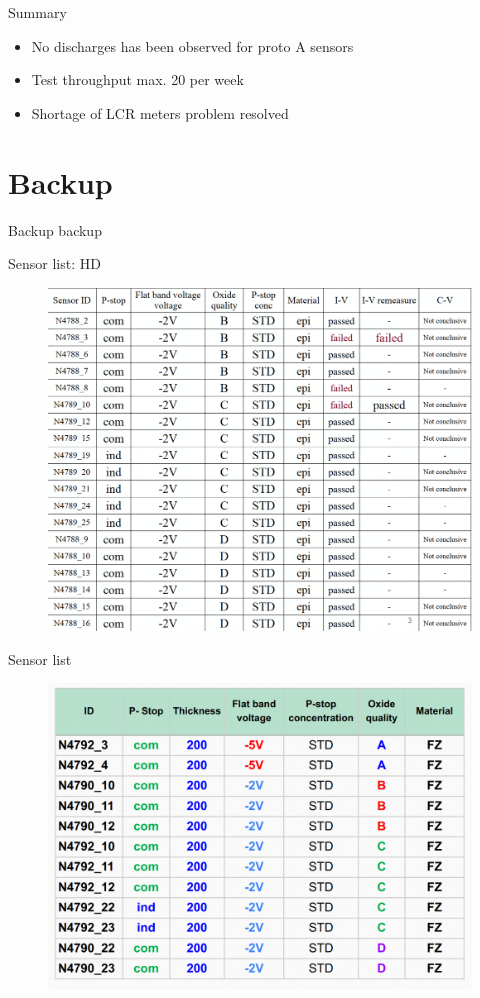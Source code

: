 \documentclass{beamer}
\begin{document}
\begin{frame}{Summary}
  \begin{itemize}
    \item No discharges has been observed for proto A sensors
    \item Test throughput max. 20 per week
    \item Shortage of LCR meters problem resolved
  \end{itemize}
\end{frame}

\section*{Backup}

\begin{frame}{Backup}
	\center
	\huge
	backup
\end{frame}

\begin{frame}{Sensor list: HD}
   \begin{figure}
       \includegraphics[width=.8\textwidth]{plots/PM8_sensorList.png}
   \end{figure} 
\end{frame}

\begin{frame}{Sensor list}
   \begin{figure}
       \includegraphics[width=.8\textwidth]{plots/winter2022_sensorList.png}
   \end{figure} 
\end{frame}
\end{document}
